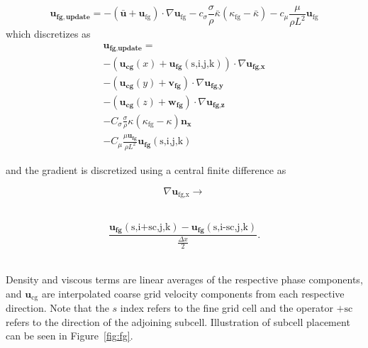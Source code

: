 \begin{equation}
 \bm{u_{fg,update}}= 
-(\bar{\bm{u}}+\bm{u}_{\text{fg}}) \cdot \nabla \bm{u}_{\text{fg}} 
-c_{\sigma}\frac{\sigma}{\rho}\bar{\kappa}(\kappa_{\text{fg}}-\bar{\kappa})- 
c_{\mu}\frac{\mu}{\rho L^2}\bm{u}_{\text{fg}}\nonumber
\label{eqn:update}
\end{equation}
which discretizes as 
\begin{multline}
 \bm{u_{\text{fg,update}}}=\\
 - ( \bm{u_{\text{cg}}}(x) + \bm{u_{\text{fg}}}(\text{s,i,j,k}) ) \cdot \nabla \bm{u_{\text{fg,x}}} \\
 - ( \bm{u_{\text{cg}}}(y) + \bm{v_{\text{fg}}}     ) \cdot \nabla \bm{u_{\text{fg,y}}} \\
 - ( \bm{u_{\text{cg}}}(z) + \bm{w_{\text{fg}}}    ) \cdot \nabla \bm{u_{\text{fg,z}}} \\
 - C_{\sigma}\frac{\sigma}{\rho}\kappa(\kappa_{\text{fg}}-\kappa)\bm{n_{\text{x}}} \\
 - C_{\mu} \frac{\mu \bm{u_{\text{fg}}}}{\rho L^2}  \bm{u_{\text{fg}}}(\text{s,i,j,k})
\end{multline}


\noindent and the gradient is discretized using a central finite difference as  

\begin{minipage}{0.25\textwidth}
	\begin{equation*}
	\nabla \bm{u}_{\text{fg,x}}  \rightarrow 
	\end{equation*}\\
\end{minipage}
\begin{minipage}{0.6\textwidth}
	\begin{equation}		
			\frac{\bm{u_{fg}}(\text{s,i+sc,j,k}) - \bm{u_{fg}}(\text{s,i-sc,j,k}) }  { \frac{\Delta x}{2}           }.
	\end{equation}\\
\end{minipage}

\noindent Density and viscous terms are linear averages of the respective phase components, and $\bm{u}_{\text{cg}}$ are interpolated coarse grid velocity components from each respective direction. Note that the $s$ index refers to the fine grid cell and the operator $+ \text{sc}$ refers to the direction of the adjoining subcell. Illustration of subcell placement can be seen in Figure~\ref{fig:fg}.

